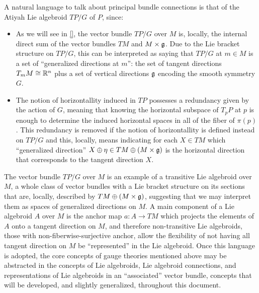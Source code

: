 A natural language to talk about principal bundle connections is that of the Atiyah Lie algebroid $TP/G$ of $P$, since:
    \begin{itemize}

    
    \item As we will see in \ref{}, the vector bundle $TP/G$ over $M$ is, locally, the internal direct sum of the vector bundles $TM$ and $M\times \mathfrak{g}$. Due to the Lie bracket structure on $TP/G$, this can be interpreted as saying that $TP/G$ at $m \in M$ is a set of ``generalized directions at $m$'': the set of tangent directions $T_m M \cong \mathbb{R}^n$ plus a set of vertical directions $\mathfrak{g}$ encoding the smooth symmetry $G$.
    
    \item The notion of horizontallity induced in $TP$  %
    possesses a redundancy given by the action of $G$, meaning that knowing the horizontal subspace of $T_p P$ at $p$ is enough to determine the induced horizontal spaces in all of the fiber of $\pi(p)$. This redundancy is removed if the notion of horizontallity is defined instead on $TP/G$ and this, locally, means indicating for each $X \in TM$ which ``generalized direction'' $X \oplus \eta \in TM \oplus (M \times \mathfrak{g})$ is the horizontal direction that corresponds to the tangent direction $X$.
        
    \end{itemize}
The vector bundle $TP/G$ over $M$ is an example of a transitive Lie algebroid over $M$, a whole class of vector bundles with a Lie bracket structure on its sections that are, locally, described by $TM \oplus (M \times \mathfrak{g})$, suggesting that we may interpret them as spaces of generalized directions on $M$. 
A main component of a Lie algebroid $A$ over $M$ is the anchor map $a : A \to TM$ which projects the elements of $A$ onto a tangent direction on $M$, and therefore non-transitive Lie algebroids, those with non-fiberwise-surjective anchor, allow the flexibility of not having all tangent direction on $M$ be ``represented'' in the Lie algebroid. Once this language is adopted, the core concepts of gauge theories mentioned above may be abstracted in the concepts of Lie algebroids, Lie algebroid connections, and representations of Lie algebroids in an ``associated'' vector bundle, concepts that will be developed, and slightly generalized, throughout this document.

